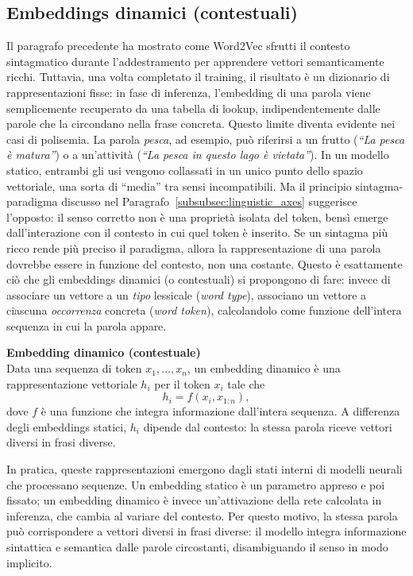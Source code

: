 \subsection{Embeddings dinamici (contestuali)}
\label{sec:dynamic_embeddings}

Il paragrafo precedente ha mostrato come Word2Vec sfrutti il contesto sintagmatico durante l'addestramento per apprendere vettori semanticamente ricchi. Tuttavia, una volta completato il training, il risultato è un dizionario di rappresentazioni fisse: in fase di inferenza, l'embedding di una parola viene semplicemente recuperato da una tabella di lookup, indipendentemente dalle parole che la circondano nella frase concreta.
Questo limite diventa evidente nei casi di polisemia. La parola \textit{pesca}, ad esempio, può riferirsi a un frutto (\textit{``La pesca è matura''}) o a un'attività (\textit{``La pesca in questo lago è vietata''}). In un modello statico, entrambi gli usi vengono collassati in un unico punto dello spazio vettoriale, una sorta di ``media'' tra sensi incompatibili. Ma il principio sintagma-paradigma discusso nel Paragrafo~\ref{subsubsec:linguistic_axes} suggerisce l'opposto: il senso corretto non è una proprietà isolata del token, bensì emerge dall'interazione con il contesto in cui quel token è inserito.
Se un sintagma più ricco rende più preciso il paradigma, allora la rappresentazione di una parola dovrebbe essere in funzione del contesto, non una costante. Questo è esattamente ciò che gli embeddings dinamici (o contestuali) si propongono di fare: invece di associare un vettore a un \emph{tipo} lessicale (\textit{word type}), associano un vettore a ciascuna \emph{occorrenza} concreta (\textit{word token}), calcolandolo come funzione dell'intera sequenza in cui la parola appare.
\begin{notebox}
\textbf{Embedding dinamico (contestuale)}\\
Data una sequenza di token $x_1, \dots, x_n$, un embedding dinamico è una rappresentazione vettoriale $h_i$ per il token $x_i$ tale che
\[
h_i = f(x_i, x_{1:n}),
\]
dove $f$ è una funzione che integra informazione dall'intera sequenza. A differenza degli embeddings statici, $h_i$ dipende dal contesto: la stessa parola riceve vettori diversi in frasi diverse.
\end{notebox}
In pratica, queste rappresentazioni emergono dagli stati interni di modelli neurali che processano sequenze. Un embedding statico è un parametro appreso e poi fissato; un embedding dinamico è invece un'attivazione della rete calcolata in inferenza, che cambia al variare del contesto. Per questo motivo, la stessa parola può corrispondere a vettori diversi in frasi diverse: il modello integra informazione sintattica e semantica dalle parole circostanti, disambiguando il senso in modo implicito.
